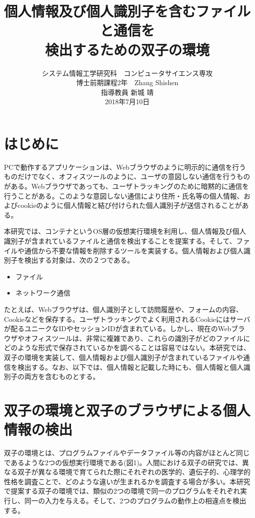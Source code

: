 \documentclass[a4paper,twocolumn,10pt]{jarticle}
\title{\vspace{-1cm}個人情報及び個人識別子を含むファイルと通信を\\検出するための双子の環境}
\author{システム情報工学研究科　コンピュータサイエンス専攻\\博士前期課程2年　Zhang Shishen\\指導教員  新城 靖\\2018年7月10日}
\date{}
\begin{document}
\maketitle

\pagestyle{plain}


\section{はじめに}
PCで動作するアプリケーションは、Webブラウザのように明示的に通信を行うものだけでなく、オフィスツールのように、ユーザの意図しない通信を行うものがある。Webブラウザであっても、ユーザトラッキングのために暗黙的に通信を行うことがある。このような意図しない通信により住所・氏名等の個人情報、およびcookieのように個人情報と結び付けられた個人識別子が送信されることがある。

本研究では、コンテナというOS層の仮想実行環境を利用し、個人情報及び個人識別子が含まれているファイルと通信を検出することを提案する\cite{web}。そして、ファイルや通信から不要な情報を削除するツールを実装する。個人情報および個人識別子を検出する対象は、次の２つである。
\begin{itemize}
\item
ファイル
\item
ネットワーク通信 
\end{itemize}

たとえば、Webブラウザは、個人識別子として訪問履歴や、フォームの内容、Cookieなどを保存する。ユーザトラッキングでよく利用されるCookieにはサーバが配るユニークなIDやセッションIDが含まれている。しかし、現在のWebブラウザやオフィスツールは、非常に複雑であり、これらの識別子がどのファイルにどのような形式で保存されているかを調べることは容易ではない。本研究では、双子の環境を実装して、個人情報および個人識別子が含まれているファイルや通信を検出する。なお、以下では、個人情報と記載した時にも、個人情報と個人識別子の両方を含むものとする。


\section{双子の環境と双子のブラウザによる個人情報の検出}

双子の環境とは、プログラムファイルやデータファイル等の内容がほとんど同じであるような2つの仮想実行環境である(図1)。人間における双子の研究では、異なる双子が異なる環境で育てられた際にそれぞれの医学的、遺伝子的、心理学的性格を調査ことで、どのような違いが生まれるかを調査する場合が多い。本研究で提案する双子の環境では、類似の2つの環境で同一のプログラムをそれぞれ実行し、同一の入力を与える。そして、2つのプログラムの動作上の相違点を検出する。
\end{document}
